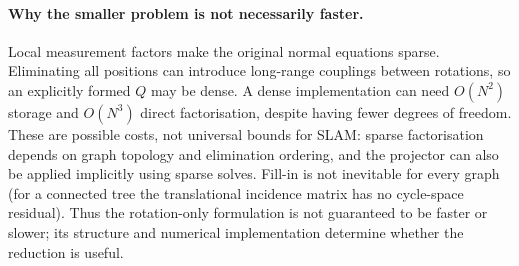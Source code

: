 \paragraph{Why the smaller problem is not necessarily faster.}
Local measurement factors make the original normal equations sparse. Eliminating all
positions can introduce long-range couplings between rotations, so an explicitly formed
$Q$ may be dense. A dense implementation can need $O(N^2)$ storage and $O(N^3)$ direct
factorisation, despite having fewer degrees of freedom. These are possible costs, not
universal bounds for SLAM: sparse factorisation depends on graph topology and elimination
ordering, and the projector can also be applied implicitly using sparse solves.
Fill-in is not inevitable for every graph (for a connected tree the translational
incidence matrix has no cycle-space residual). Thus the rotation-only formulation is not
guaranteed to be faster or slower; its structure and numerical implementation determine
whether the reduction is useful.
